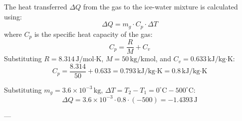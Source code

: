 The heat transferred \( \Delta Q \) from the gas to the ice-water mixture is calculated using:  
\[
\Delta Q = m_g \cdot C_p \cdot \Delta T
\]  
where \( C_p \) is the specific heat capacity of the gas:  
\[
C_p = \frac{R}{M} + C_v
\]  
Substituting \( R = 8.314 \, \text{J/mol·K} \), \( M = 50 \, \text{kg/kmol} \), and \( C_v = 0.633 \, \text{kJ/kg·K} \):  
\[
C_p = \frac{8.314}{50} + 0.633 = 0.793 \, \text{kJ/kg·K} = 0.8 \, \text{kJ/kg·K}
\]  

Substituting \( m_g = 3.6 \times 10^{-3} \, \text{kg} \), \( \Delta T = T_2 - T_1 = 0^\circ\text{C} - 500^\circ\text{C} \):  
\[
\Delta Q = 3.6 \times 10^{-3} \cdot 0.8 \cdot (-500) = -1.4393 \, \text{J}
\]  

---